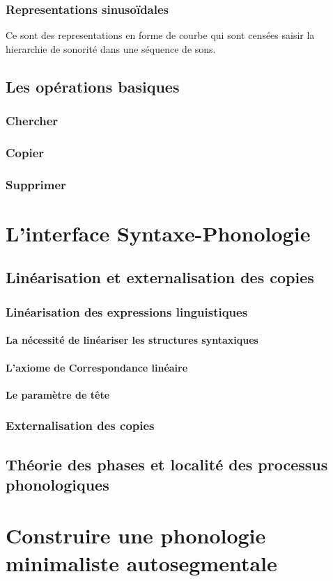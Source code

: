       \subsubsection{Representations sinuso\"idales}
        Ce sont des representations en forme de courbe qui sont cens\'ees saisir la hierarchie de sonorit\'e dans une s\'equence de sons.
    \subsection{Les op\'erations basiques}
      \subsubsection{Chercher}
        
      \subsubsection{Copier}
        
      \subsubsection{Supprimer}
           	
  \section{L'interface Syntaxe-Phonologie}
    \subsection{Lin\'earisation et externalisation des copies}
      \subsubsection{Lin\'earisation des expressions linguistiques}
        \paragraph{La n\'ecessit\'e de lin\'eariser les structures syntaxiques}
        
        \paragraph{L'axiome de Correspondance lin\'eaire}
          
        \paragraph{Le param\`etre de t\^ete}
          
      \subsubsection{Externalisation des copies}
    \subsection[D\'erivation phonologique par phases]{Th\'eorie des phases et localit\'e des processus phonologiques}
  \section{Construire une phonologie minimaliste autosegmentale}
        
\endinput 